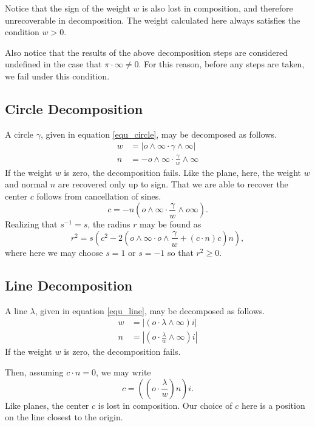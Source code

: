 \documentclass[12pt]{article}
\newcommand{\nvao}{o}
\newcommand{\nvai}{\infty}
\begin{document}
Notice that the sign of the weight $w$ is also lost in composition, and therefore
unrecoverable in decomposition.  The weight calculated here always satisfies
the condition $w>0$.

Also notice that the results of the above decomposition steps are considered
undefined in the case that $\pi\cdot\nvai\neq 0$.  For this reason, before
any steps are taken, we fail under this condition.

\subsection{Circle Decomposition}

A circle $\gamma$, given in equation \eqref{equ_circle}, may be decomposed as follows.
\begin{align}
w &= |\nvao\wedge\nvai\cdot\gamma\wedge\nvai| \\
n &= -\nvao\wedge\nvai\cdot\frac{\gamma}{w}\wedge\nvai
\end{align}
If the weight $w$ is zero, the decomposition fails.
Like the plane, here, the weight $w$ and normal $n$ are recovered
only up to sign.  That we are able to recover the center $c$ follows
from cancellation of sines.
\begin{equation}
c = -n\left(\nvao\wedge\nvai\cdot
\frac{\gamma}{w}\wedge\nvao\nvai\right).
\end{equation}
Realizing that $s^{-1}=s$, the radius $r$ may be found as
\begin{equation}
r^2=s\left(c^2-2\left(\nvao\wedge\nvai\cdot\nvao\wedge\frac{\gamma}{w}+
(c\cdot n)c\right)n\right),
\end{equation}
where here we may choose $s=1$ or $s=-1$ so that $r^2\geq 0$.

\subsection{Line Decomposition}

A line $\lambda$, given in equation \eqref{equ_line}, may be decomposed
as follows.
\begin{align}
w &= |(\nvao\cdot\lambda\wedge\nvai)i| \\
n &= \left|\left(\nvao\cdot\frac{\lambda}{w}\wedge\nvai\right)i\right|
\end{align}
If the weight $w$ is zero, the decomposition fails.

Then, assuming $c\cdot n=0$, we may write
\begin{equation}
c = \left(\left(\nvao\cdot\frac{\lambda}{w}\right)n\right)i.
\end{equation}
Like planes, the center $c$ is lost in composition.  Our choice
of $c$ here is a position on the line closest to the origin.
\end{document}
